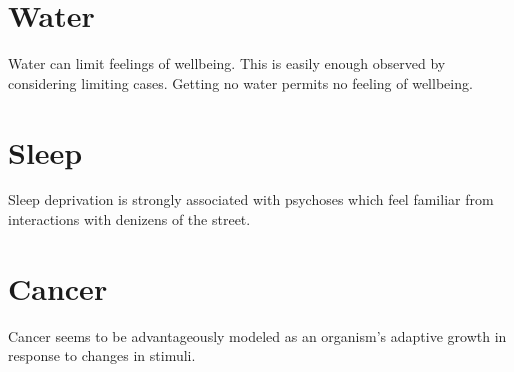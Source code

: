 \chapter{Water}
Water can limit feelings of wellbeing.
This is easily enough observed by considering limiting cases.
Getting no water permits no feeling of wellbeing.

\chapter{Sleep}
Sleep deprivation is strongly associated with psychoses which feel familiar from interactions with denizens of the street.

\chapter{Cancer}
Cancer seems to be advantageously modeled as an organism's adaptive growth in response to changes in stimuli.


